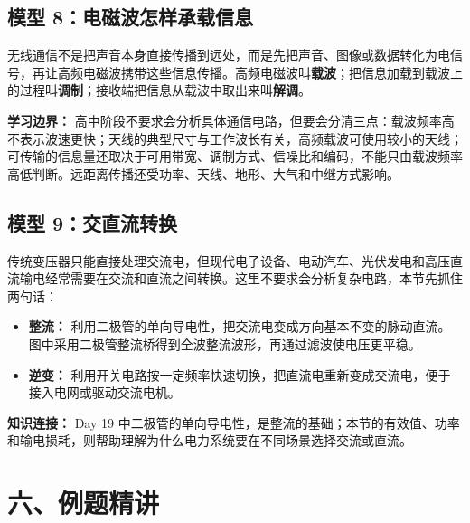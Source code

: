 \subsection*{模型 8：电磁波怎样承载信息}

无线通信不是把声音本身直接传播到远处，而是先把声音、图像或数据转化为电信号，再让高频电磁波携带这些信息传播。高频电磁波叫\textbf{载波}；把信息加载到载波上的过程叫\textbf{调制}；接收端把信息从载波中取出来叫\textbf{解调}。

\begin{center}


\label{fig:em-communication-chain}
\end{center}

\textbf{学习边界：} 高中阶段不要求会分析具体通信电路，但要会分清三点：载波频率高不表示波速更快；天线的典型尺寸与工作波长有关，高频载波可使用较小的天线；可传输的信息量还取决于可用带宽、调制方式、信噪比和编码，不能只由载波频率高低判断。远距离传播还受功率、天线、地形、大气和中继方式影响。

\subsection*{模型 9：交直流转换}

传统变压器只能直接处理交流电，但现代电子设备、电动汽车、光伏发电和高压直流输电经常需要在交流和直流之间转换。这里不要求会分析复杂电路，本节先抓住两句话：
\begin{itemize}
  \item \textbf{整流：} 利用二极管的单向导电性，把交流电变成方向基本不变的脉动直流。图中采用二极管整流桥得到全波整流波形，再通过滤波使电压更平稳。
  \item \textbf{逆变：} 利用开关电路按一定频率快速切换，把直流电重新变成交流电，便于接入电网或驱动交流电机。
\end{itemize}

\begin{center}


\label{fig:ac-dc-conversion}
\end{center}

\textbf{知识连接：} Day 19 中二极管的单向导电性，是整流的基础；本节的有效值、功率和输电损耗，则帮助理解为什么电力系统要在不同场景选择交流或直流。

\section*{六、例题精讲}

